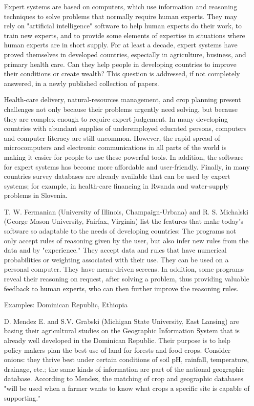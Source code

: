 Expert systems are based on computers, which use information and
reasoning techniques to solve problems that normally require human 
experts. They may rely on "artificial intelligence" software to help
human experts do their work, to train new experts, and to provide some
elements of expertise in situations where human experts are in short
supply. For at least a decade, expert systems have proved themselves in
developed countries, especially in agriculture, business, and primary
health care. Can they help people in developing countries to improve
their conditions or create wealth? This question is addressed, if not
completely answered, in a newly published collection of papers.

Health-care delivery, natural-resources management, and crop planning
present challenges not only because their problems urgently need
solving, but because they are complex enough to require expert judgement. 
In many developing countries with abundant supplies of underemployed
educated persons, computers and computer-literacy are still uncommon.
However, the rapid spread of microcomputers and electronic
communications in all parts of the world is making it easier for people to use 
these powerful tools. In addition, the software for expert systems has
become more affordable and user-friendly. Finally, in many countries
survey databases are already available that can be used by expert
systems; for example, in health-care financing in Rwanda and water-supply 
problems in Slovenia.

T. W. Fermanian (University of Illinois, Champaign-Urbana) and R. S.
Michalski (George Mason University, Fairfax, Virginia) list the features
that make today's software so adaptable to the needs of developing
countries: The programs not only accept rules of reasoning given by the 
user, but also infer new rules from the data and by "experience." They
accept data and rules that have numerical probabilities or weighting
associated with their use. They can be used on a personal computer. They
have menu-driven screens. In addition, some programs reveal their
reasoning on request, after solving a problem, thus providing valuable 
feedback to human experts, who can then further improve the reasoning
rules.

Examples: Dominican Republic, Ethiopia

D. Mendez E. and S.V. Grabski (Michigan State University, East Lansing)
are basing their agricultural studies on the Geographic Information
System that is already well developed in the Dominican Republic. Their
purpose is to help policy makers plan the best use of land for forests
and food crops. Consider onions: they thrive best under certain
conditions of soil pH, rainfall, temperature, drainage, etc.; the same kinds 
of information are part of the national geographic database. According
to Mendez, the matching of crop and geographic databases "will be used
when a farmer wants to know what crops a specific site is capable of
supporting."

